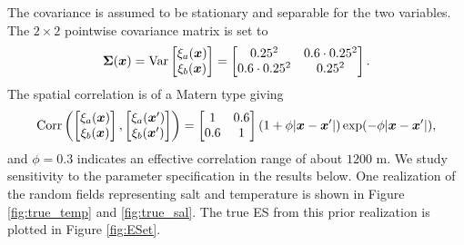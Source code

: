 \documentclass[aoas]{imsart}
\begin{document}
The covariance is assumed to be stationary and separable for the two variables. 
The $2 \times 2$ pointwise covariance matrix is set to
\begin{equation}\label{v0}
\bSigma(\bx)=\mbox{Var} 
\begin{bmatrix}
    \xi_a(\bx) \\
    \xi_b(\bx) 
    \end{bmatrix}=
\begin{bmatrix}
0.25^2 & 0.6 \cdot 0.25^2 \\
0.6 \cdot 0.25^2 & 0.25^2
\end{bmatrix}.
\end{equation}
The spatial correlation is of a Matern type giving
\begin{equation}\label{v}
\mbox{Corr} 
\left(
\begin{bmatrix}
    \xi_a(\bx) \\
    \xi_b(\bx) 
    \end{bmatrix},
    \begin{bmatrix}
    \xi_a(\bx') \\
    \xi_b(\bx') 
    \end{bmatrix}
    \right)
    = \begin{bmatrix}
1 & 0.6  \\
0.6  & 1
\end{bmatrix}(1+\phi |\bx-\bx'|)\exp (-\phi |\bx-\bx'|),
\end{equation}
and $\phi=0.3$ indicates an effective correlation range of about $1200$ m. 
We study sensitivity to the parameter specification in the results below.
One realization of the random fields representing salt and temperature is shown in Figure \ref{fig:true_temp} and \ref{fig:true_sal}. The true ES from this prior realization is plotted in Figure \ref{fig:ESet}.
\end{document}
